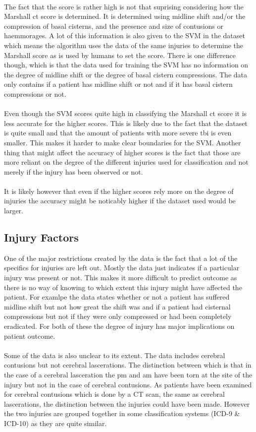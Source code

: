 \documentclass[11pt]{article}
\begin{document}
\\
The fact that the score is rather high is not that suprising considering how the Marshall \gls{ct} score is determined. It is determined using midline shift and/or the compression of basal cisterns, and the presence and size of contusions or haemmorages. A lot of this information is also given to the SVM in the dataset which means the algorithm uses the data of the same injuries to determine the Marshall score as is used by humans to set the score. There is one difference though, which is that the data used for training the SVM has no information on the degree of midline shift or the degree of basal cistern compressions. The data only contains if a patient has midline shift or not and if it has basal cistern compressions or not.\\
\\
Even though the SVM scores quite high in classifying the Marshall \gls{ct} score it is less accurate for the higher scores. This is likely due to the fact that the dataset is quite small and that the amount of patients with more severe \gls{tbi} is even smaller. This makes it harder to make clear boundaries for the SVM. Another thing that might affect the accuracy of higher scores is the fact that those are more reliant on the degree of the different injuries used for classification and not merely if the injury has been observed or not.\\
\\
It is likely however that even if the higher scores rely more on the degree of injuries the accuracy might be noticably higher if the dataset used would be larger.

\subsection{Injury Factors}
One of the major restrictions created by the data is the fact that a lot of the specifics for injuries are left out. Mostly the data just indicates if a particular injury was present or not. This makes it more difficult to predict outcome as there is no way of knowing to which extent this injury might have affected the patient. For examlpe the data states whether or not a patient has suffered midline shift but not how great the shift was and if a patient had cisternal compressions but not if they were only compressed or had been completely eradicated. For both of these the degree of injury has major implications on patient outcome.\\
\\
Some of the data is also unclear to its extent. The data includes cerebral contusions but not cerebral lascerations. The distinction between which is that in the case of a cerebral lasceration the \gls{pm} and \gls{am} have been torn at the site of the injury but not in the case of cerebral contusions. As patients have been examined for cerebral contusions which is done by a CT scan\cite{CerebralContusion2020}, the same as cerebral lascerations\cite{CerebralLaceration2018}, the distinction between the injuries could have been made. However the two injuries are grouped together in some classification systems (ICD-9 \& ICD-10\cite{CerebralLaceration2018}\cite{ICD102021}) as they are quite similar.
\end{document}
